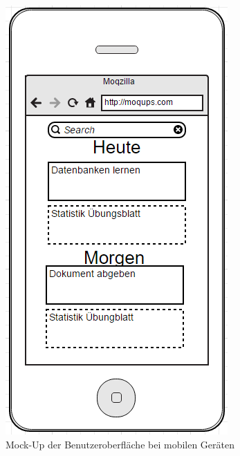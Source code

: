 \begin{figure}[H]
\centering
\includegraphics[scale=0.6]{images/mockup_mobile}
\caption{Mock-Up der Benutzeroberfläche bei mobilen Geräten}
\end{figure}


